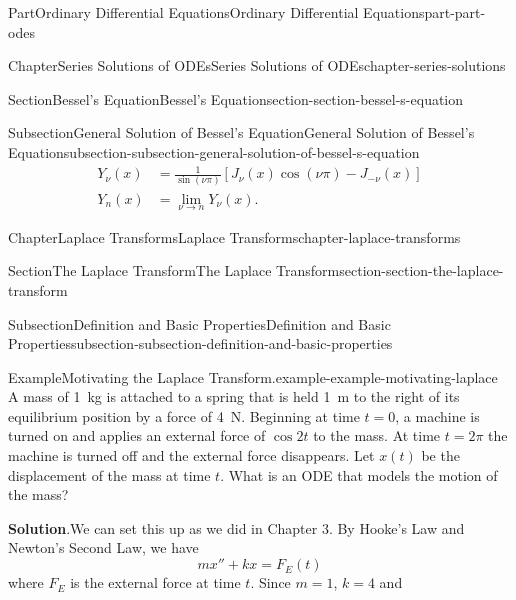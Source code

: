 \documentclass[twoside,10pt,]{book}
\newcommand{\blocktitlefont}{\relax}
\numberwithin{equation}{part}
\begin{document}
\begin{partptx}{Part}{Ordinary Differential Equations}{}{Ordinary Differential Equations}{}{}{part-part-odes}
\begin{chapterptx}{Chapter}{Series Solutions of ODEs}{}{Series Solutions of ODEs}{}{}{chapter-series-solutions}
\begin{sectionptx}{Section}{Bessel's Equation}{}{Bessel's Equation}{}{}{section-section-bessel-s-equation}
\begin{subsectionptx}{Subsection}{General Solution of Bessel's Equation}{}{General Solution of Bessel's Equation}{}{}{subsection-subsection-general-solution-of-bessel-s-equation}
\begin{align}
Y_{\nu}(x) & = \frac{1}{\sin(\nu\pi)}[J_{\nu}(x)\cos(\nu\pi) - J_{-\nu}(x)]\label{mrow-equation-bessel-second-kind-noninteger}\\
Y_{n}(x) & = \lim_{\nu\to n}Y_{\nu}(x)\text{.}\label{mrow-equation-bessel-second-kind-integer}
\end{align}
%
\end{subsectionptx}
\end{sectionptx}
\end{chapterptx}
%
\typeout{************************************************}
\typeout{************************************************}
%
\begin{chapterptx}{Chapter}{Laplace Transforms}{}{Laplace Transforms}{}{}{chapter-laplace-transforms}
\renewcommand*{\chaptername}{Chapter}
%
%
\typeout{************************************************}
\typeout{************************************************}
%
\begin{sectionptx}{Section}{The Laplace Transform}{}{The Laplace Transform}{}{}{section-section-the-laplace-transform}
%
%
\typeout{************************************************}
\typeout{************************************************}
%
\begin{subsectionptx}{Subsection}{Definition and Basic Properties}{}{Definition and Basic Properties}{}{}{subsection-subsection-definition-and-basic-properties}
\begin{example}{Example}{Motivating the Laplace Transform.}{example-example-motivating-laplace}%
A mass of \SI{1}{\kilogram} is attached to a spring that is held \SI{1}{\meter} to the right of its equilibrium position by a force of \SI{4}{\newton}. Beginning at time \(t=0\), a machine is turned on and applies an external force of \(\cos2t\) to the mass. At time \(t=2\pi\) the machine is turned off and the external force disappears. Let \(x(t)\) be the displacement of the mass at time \(t\). What is an ODE that models the motion of the mass?%
\par\smallskip%
\noindent\textbf{\blocktitlefont Solution}.\hypertarget{solution-example-motivating-laplace-c}{}\quad{}We can set this up as we did in Chapter 3. By Hooke's Law and Newton's Second Law, we have%
\begin{equation*}
mx''+kx = F_{E}(t)
\end{equation*}
where \(F_{E}\) is the external force at time \(t\). Since \(m = 1\), \(k = 4\) and%

\end{example}
\end{subsectionptx}
\end{sectionptx}
\end{chapterptx}
\end{partptx}
\end{document}
